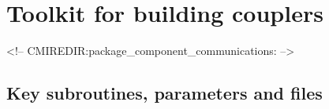 \section{Toolkit for building couplers}
\label{sec:component_communications}
\label{sec:pkg:component_communications}
\begin{rawhtml}
<!-- CMIREDIR:package_component_communications: -->
\end{rawhtml}

\subsection{Key subroutines, parameters and files}
\label{sec:pkg:component_communications:implementation_synopsis}
